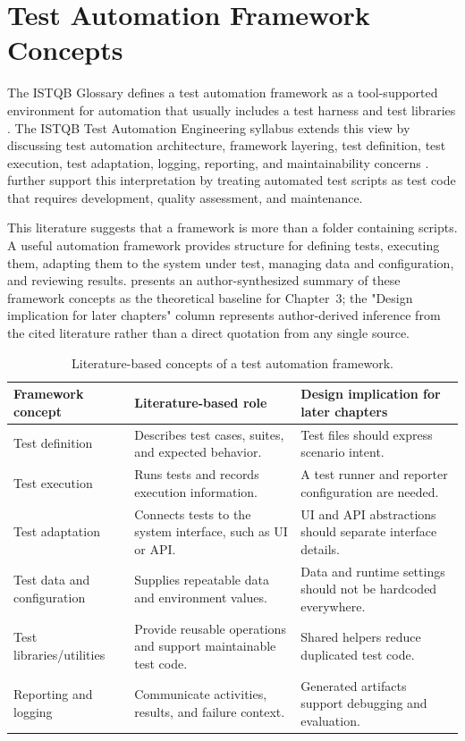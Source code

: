 \section{Test Automation Framework Concepts}
\label{sec:ch2-framework-concepts}

The ISTQB Glossary defines a test automation framework as a tool-supported environment for automation that usually includes a test harness and test libraries \autocite{istqb_glossary_test_automation_framework_2026}. The ISTQB Test Automation Engineering syllabus extends this view by discussing test automation architecture, framework layering, test definition, test execution, test adaptation, logging, reporting, and maintainability concerns \autocite{istqb_ctal_tae_syllabus_2024}. \textcite{garousi_felderer_test_scripts_2016} further support this interpretation by treating automated test scripts as test code that requires development, quality assessment, and maintenance.

This literature suggests that a framework is more than a folder containing scripts. A useful automation framework provides structure for defining tests, executing them, adapting them to the system under test, managing data and configuration, and reviewing results.  presents an author-synthesized summary of these framework concepts as the theoretical baseline for Chapter~3; the "Design implication for later chapters" column represents author-derived inference from the cited literature rather than a direct quotation from any single source.

\begin{table}[htbp]
  \centering
  \tablefont
  \begin{tabularx}{\textwidth}{YYY}
    \toprule
    Framework concept & Literature-based role & Design implication for later chapters \\
    \midrule
    Test definition & Describes test cases, suites, and expected behavior. & Test files should express scenario intent. \\
    Test execution & Runs tests and records execution information. & A test runner and reporter configuration are needed. \\
    Test adaptation & Connects tests to the system interface, such as UI or API. & UI and API abstractions should separate interface details. \\
    Test data and configuration & Supplies repeatable data and environment values. & Data and runtime settings should not be hardcoded everywhere. \\
    Test libraries/utilities & Provide reusable operations and support maintainable test code. & Shared helpers reduce duplicated test code. \\
    Reporting and logging & Communicate activities, results, and failure context. & Generated artifacts support debugging and evaluation. \\
    \bottomrule
  \end{tabularx}
  \caption{Literature-based concepts of a test automation framework.}
  \label{tab:literature-based-framework-concepts}
\end{table}

